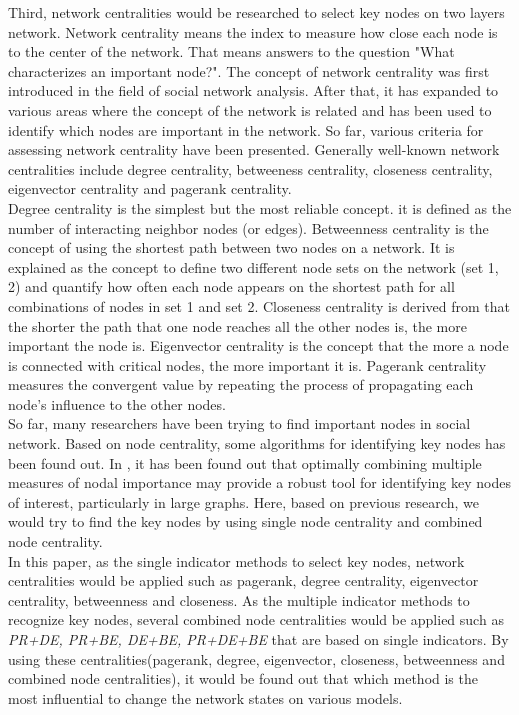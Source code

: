 Third, network centralities would be researched to select key nodes on two layers network. Network centrality means the index to measure how close each node is to the center of the network. That means answers to the question "What characterizes an important node?". The concept of network centrality was first introduced in the field of social network analysis.\parencite{freeman1979} After that, it has expanded to various areas where the concept of the network is related and has been used to identify which nodes are important in the network. So far, various criteria for assessing network centrality have been presented. Generally well-known network centralities include degree centrality, betweeness centrality, closeness centrality, eigenvector centrality and pagerank centrality.\parencite{koschutzki2008, francisco2019, bianconi2018}\\
Degree centrality is the simplest but the most reliable concept. it is defined as the number of interacting neighbor nodes (or edges). Betweenness centrality is the concept of using the shortest path between two nodes on a network. It is explained as the concept to  define two different node sets on the network (set 1, 2) and quantify how often each node appears on the shortest path for all combinations of nodes in set 1 and set 2. Closeness centrality is derived from that the shorter the path that one node reaches all the other nodes is, the more important the node is. Eigenvector centrality is the concept that the more a node is connected with critical nodes, the more important it is. Pagerank centrality measures the convergent value by repeating the process of propagating each node's influence to the other nodes.\\
So far, many researchers have been trying to find important nodes in social network.\parencite{eom2015, white2003, mesgari2015, hwang1981, huang2014} Based on node centrality, some algorithms for identifying key nodes has been found out. In \parencite{mesgari2015, huang2014}, it has been found out that optimally combining multiple measures of nodal importance may provide a robust tool for identifying key nodes of interest, particularly in large graphs. Here, based on previous research, we would try to find the key nodes by using single node centrality and combined node centrality. \\

In this paper, as the single indicator methods to select key nodes, network centralities would be applied such as pagerank, degree centrality, eigenvector centrality, betweenness and closeness. As the multiple indicator methods to recognize key nodes, several combined node centralities would be applied such as \textit{PR+DE, PR+BE, DE+BE, PR+DE+BE} that are based on single indicators.  By using these centralities(pagerank, degree, eigenvector, closeness, betweenness and combined node centralities), it would be found out that which method is the most influential to change the network states on various models.\\  

